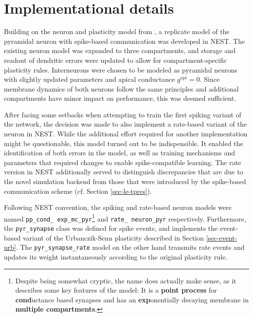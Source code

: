 \section{Implementational details}

Building on the neuron and plasticity model from \citep{Stapmanns2021}, a replicate model of the pyramidal neuron with
spike-based communication was developed in NEST. The existing neuron model was expanded to three compartments, and
storage and readout of dendritic errors were updated  to allow for compartment-specific plasticity rules. Interneurons
were chosen to be modeled as pyramidal neurons with slightly updated parameters and apical conductance $g^{api}=0$.
Since membrane dynamics of both neurons follow the same principles and additional compartments have minor impact on
performance, this was deemed sufficient.

After facing some setbacks when attempting to train the first spiking variant of the network, the decision was made to
also implement a rate-based variant of the neuron in NEST.  While the additional effort required for another
implementation might be questionable, this model turned out to be indispensible. It enabled the identification of both
errors in the model, as well as training mechanisms and parameters that required changes to enable spike-compatible
learning. The rate version in NEST additionally served to distinguish discrepancies that are due to the novel simulation
backend from those that were introduced by the spike-based communication scheme (cf. Section \ref{sec-le-tpres}).

Following NEST convention, the spiking and rate-based neuron models were named \texttt{pp\_\allowbreak cond\_\allowbreak
  exp\_\allowbreak mc\_\allowbreak pyr}\footnote{Despite being somewhat cryptic, the name does actually make sense, as
  it describes some key features of the model: It is a \textbf{point process} for \textbf{cond}uctance based synapses
  and has an \textbf{exp}onentially decaying membrane in \textbf{multiple compartments}.} and \texttt{rate\_\allowbreak
  neuron\_\allowbreak pyr} respectively. Furthermore, the \texttt{pyr\_\allowbreak synapse} class was defined for spike
  events, and implements the event-based variant of the Urbanczik-Senn plasticity described in Section
  \ref{sec-event-urb}. The \texttt{pyr\_\allowbreak synapse\_\allowbreak rate} model on the other hand transmits rate
  events and updates its weight instantaneously according to the original plasticity rule.

